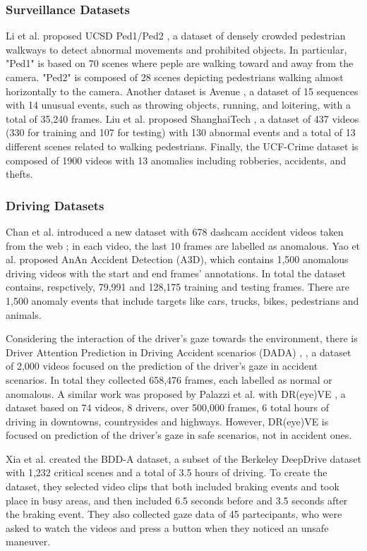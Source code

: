 \subsubsection{Surveillance Datasets}
Li et al. proposed UCSD Ped1/Ped2 \cite{ucsd}, 
a dataset of densely 
crowded pedestrian walkways to detect abnormal movements and prohibited objects.
In particular, "Ped1" is based on 70 scenes where peple are walking toward and 
away from the camera.
"Ped2" is composed of 28 scenes depicting pedestrians walking almost 
horizontally to the camera.
Another dataset is Avenue \cite{avenue}, a dataset of 15 sequences with 14 
unusual events, such as throwing objects, running, and loitering, with a total 
of 35,240 frames.
Liu et al. proposed ShanghaiTech \cite{shanghaitech_dataset}, a dataset of 437 
videos (330 
for training and 107 for testing) with 130 abnormal events and a total of 
13 different scenes related to walking pedestrians.
Finally, the UCF-Crime dataset \cite{ucf_crime} is composed of 1900 videos 
with 13 anomalies including robberies, accidents, and thefts.

\subsubsection{Driving Datasets}
Chan et al. introduced a new dataset with 678 dashcam accident videos taken from 
the web \cite{anticip_accident_dashcam}; in each video, the last 10 frames are 
labelled as anomalous.
Yao et al. proposed AnAn Accident Detection (A3D)\cite{a3d}, which contains 1,500
anomalous driving videos with the start and end frames' annotations. In total 
the dataset contains, respctively, 79,991 and 128,175 training and testing frames.
There are 1,500 anomaly events that include targets like cars, trucks, bikes, 
pedestrians and animals.

Considering the interaction of the driver's gaze towards the environment,
there is Driver Attention Prediction in Driving Accident scenarios (DADA) 
\cite{dada1}, \cite{dada2}, a dataset of 2,000 videos focused on the prediction 
of the driver's gaze in accident scenarios. In total they collected 658,476 
frames, each labelled as normal or anomalous. A similar work was proposed 
by Palazzi et al. with DR(eye)VE \cite{dreyeve}, a dataset based on 74 
videos, 8 drivers, over 500,000 frames, 6 total hours of driving in 
downtowns, countrysides and highways. 
However, DR(eye)VE is focused on prediction of the driver's gaze in 
safe scenarios, not in accident ones.

Xia et al. created the BDD-A \cite{bdd_a} dataset, a subset of the Berkeley 
DeepDrive dataset \cite{bdd100k} with 1,232 critical scenes and a total of 
3.5 hours of driving. To create the dataset, they selected video clips that 
both included braking events and took place in busy areas, and then included 
6.5 seconds before and 3.5 seconds after the braking event.
They also collected gaze data of 45 partecipants, who were asked to watch 
the videos and press a button when they noticed an unsafe maneuver.

